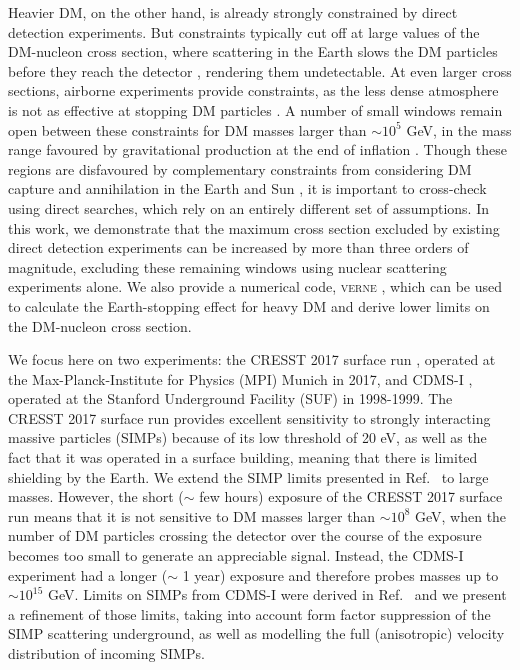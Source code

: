 \documentclass[prd,twocolumn,showpacs,nofootinbib,aps]{revtex4-1}
\begin{document}
Heavier DM, on the other hand, is already strongly constrained by direct detection experiments. But constraints typically cut off at large values of the DM-nucleon cross section, where scattering in the Earth slows the DM particles before they reach the detector \cite{Starkman:1990nj,Albuquerque:2003ei}, rendering them undetectable. At even larger cross sections, airborne experiments provide constraints, as the less dense atmosphere is not as effective at stopping DM particles \cite{Davis:2017noy}. A number of small windows remain open between these constraints for DM masses larger than $\sim10^5$ GeV, in the mass range favoured by gravitational production at the end of inflation \cite{Hui:1998dc,Allahverdi:2002nb,Kannike:2016jfs}. Though these regions are disfavoured by complementary constraints from considering DM capture and annihilation in the Earth and Sun \cite{Mack:2007xj,Albuquerque:2010bt,Mack:2012ju}, it is important to cross-check using direct searches, which rely on an entirely different set of assumptions. In this work, we demonstrate that the maximum cross section excluded by existing direct detection experiments can be increased by more than three orders of magnitude, excluding these remaining windows using nuclear scattering experiments alone. We also provide a numerical code, \textsc{verne} \cite{verne}, which can be used to calculate the Earth-stopping effect for heavy DM and derive lower limits on the DM-nucleon cross section.

We focus here on two experiments: the CRESST 2017 surface run \cite{Angloher:2017sxg}, operated at the Max-Planck-Institute for Physics (MPI) Munich in 2017, and CDMS-I \cite{Abusaidi:2000wg,Abrams:2002nb}, operated at the Stanford Underground Facility (SUF) in 1998-1999. The CRESST 2017 surface run provides excellent sensitivity to strongly interacting massive particles (SIMPs) because of its low threshold of 20 eV, as well as the fact that it was operated in a surface building, meaning that there is limited shielding by the Earth. We extend the SIMP limits presented in Ref.~\cite{Davis:2017noy} to large masses. However, the short  ($\sim$ few hours) exposure of the CRESST 2017 surface run means that it is not sensitive to DM masses larger than $\sim10^8$ GeV, when the number of DM particles crossing the detector over the course of the exposure becomes too small to generate an appreciable signal. Instead, the CDMS-I experiment had a longer ($\sim$ 1 year) exposure and therefore probes masses up to  $\sim10^{15}$ GeV. Limits on SIMPs from CDMS-I were derived in Ref.~\cite{Albuquerque:2003ei} and we present a refinement of those limits, taking into account form factor suppression of the SIMP scattering underground, as well as modelling the full (anisotropic) velocity distribution of incoming SIMPs.
\end{document}
